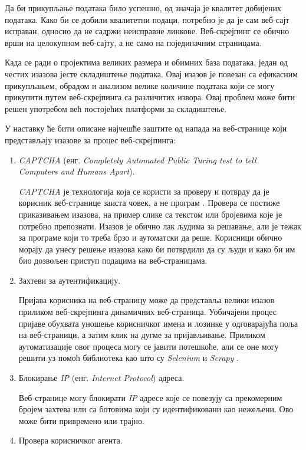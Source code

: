 \documentclass[12pt,oneside]{memoir}
\begin{document}
Да би прикупљање података било успешно, од значаја је квалитет добијених података. Како би се добили квалитетни подаци, потребно је да је сам веб-сајт исправан, односно да не садржи неисправне линкове. Веб-скрејпинг се обично врши на целокупном веб-сајту, а не само на појединачним страницама.

Када се ради о пројектима великих размера и обимних база података, један од честих изазова јесте складиштење података. Овај изазов је повезан са ефикасним прикупљањем, обрадом и анализом велике количине података који се могу прикупити путем веб-скрејпинга са различитих извора. Овај проблем може бити решен употребом већ постојећих платформи за складиштење.

У наставку ће бити описане најчешће заштите од напада на веб-странице који представљају изазове за процес веб-скрејпинга:
\begin{enumerate}
\item \emph{CAPTCHA} (енг. \textit{Completely Automated Public Turing test to tell\\Computers and Humans Apart}).

    \textit{CAPTCHA} је технологија која се користи за проверу и потврду да је корисник веб-странице заиста човек, а не програм \cite{captcha}. Провера се постиже приказивањем изазова, на пример слике са текстом или бројевима које је потребно препознати. Изазов је обично лак људима за решавање, али је тежак за програме који то треба брзо и аутоматски да реше. Корисници обично морају да унесу решење изазова како би потврдили да су људи и како би им био дозвољен приступ подацима на веб-страницама.
\item Захтеви за аутентификацију.

    Пријава корисника на веб-страницу може да представља велики изазов приликом веб-скрејпинга динамичних веб-страница. Уобичајени процес пријаве обухвата уношење корисничког имена и лозинке у одговарајућа поља на веб-страници, а затим клик на дугме за пријављивање. Приликом аутоматизације овог процеса могу се јавити потешкоће, али се оне могу решити уз помоћ библиотека као што су \textit{Selenium} \cite{selenium} и \textit{Scrapy} \cite{scrapy}.

\item Блокирање \emph{IP} (енг. \textit{Internet Protocol}) адреса.

    Веб-странице могу блокирати \textit{IP} адресе које се повезују са прекомерним бројем захтева или са ботовима који су идентификовани као нежељени. Ово може бити привремено или трајно.
\item Провера корисничког агента.


\end{enumerate}
\end{document}
